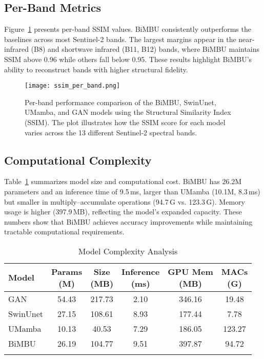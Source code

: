 \subsection{Per-Band Metrics}

Figure~\ref{fig:ssi-band} presents per-band SSIM values. BiMBU consistently outperforms the baselines across most Sentinel-2 bands. The largest margins appear in the near-infrared (B8) and shortwave infrared (B11, B12) bands, where BiMBU maintains SSIM above 0.96 while others fall below 0.95. These results highlight BiMBU’s ability to reconstruct bands with higher structural fidelity.

\begin{figure}
    \centering
    \texttt{[image: ssim\_per\_band.png]}
    \caption{Per-band performance comparison of the BiMBU, SwinUnet, UMamba, and GAN models using the Structural Similarity Index (SSIM). The plot illustrates how the SSIM score for each model varies across the 13 different Sentinel-2 spectral bands.}
    \label{fig:ssi-band}
\end{figure}



\subsection{Computational Complexity}

Table~\ref{tab:model-complexity} summarizes model size and computational cost. BiMBU has 26.2M parameters and an inference time of 9.5\,ms, larger than UMamba (10.1M, 8.3\,ms) but smaller in multiply–accumulate operations (94.7\,G vs. 123.3\,G). Memory usage is higher (397.9\,MB), reflecting the model’s expanded capacity. These numbers show that BiMBU achieves accuracy improvements while maintaining tractable computational requirements.


\begin{table}
    \centering
    \caption{Model Complexity Analysis}
    \begin{tabular}{lccccc}
        \toprule
        \textbf{Model} & \makecell{\textbf{Params} \\ \textbf{(M)}} & \makecell{\textbf{Size} \\ \textbf{(MB)}} & \makecell{\textbf{Inference} \\ \textbf{(ms)}} & \makecell{\textbf{GPU Mem} \\ \textbf{(MB)}} & \makecell{\textbf{MACs} \\ \textbf{(G)}} \\
        \midrule
        GAN  & 54.43 & 217.73 & 2.10 & 346.16 & 19.48  \\
        SwinUnet & 27.15 & 108.61 & 8.93 & 177.44 & 7.78   \\
        UMamba   & 10.13 & 40.53  & 7.29 & 186.05 & 123.27 \\
        BiMBU   & 26.19 & 104.77 & 9.51 & 397.87 & 94.72  \\
        \bottomrule
        \label{tab:model-complexity}
    \end{tabular}
\end{table}



